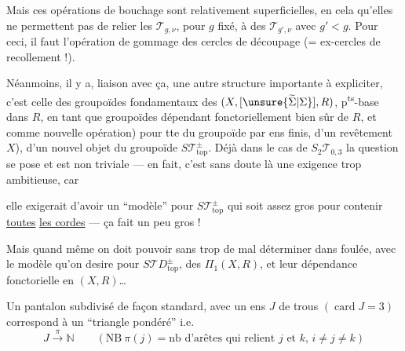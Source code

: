 Mais ces opérations de bouchage sont relativement superficielles, en cela qu'elles ne permettent pas de relier les $\mathcal T_{g,\nu}$, pour $g$ fixé, à des $\mathcal T_{g',\nu}$ avec $g'<g$. Pour ceci, il faut l'opération  de gommage des cercles de découpage (= ex-cercles de recollement !).

Néanmoins, il y a,   liaison avec ça, une autre structure importante à expliciter, c'est celle des  groupoïdes fondamentaux  des $(X,[\unsure{\widetilde{\Sigma}|\Sigma}],R)$, p\textsuperscript{ts}-base dans $R$,  en tant que groupoïdes dépendant fonctoriellement bien sûr de $R$, et  comme nouvelle opération) pour tte   du groupoïde par ens finis, \inserted{[\unsure{définissant un}} d'un revêtement   $X$), d'un nouvel objet du  groupoïde $S\mathcal T_{\mathrm{top}}^\pm$. Déjà dans le cas de $S_2\mathcal T_{0,3}$ la question se pose et est non triviale --- en fait, c'est sans doute là une exigence trop ambitieuse, car


elle exigerait d'avoir un ``modèle'' pour $S\mathcal T_{\mathrm{top}}^\pm$ qui soit assez gros pour contenir  \uline{toutes} \uline{les cordes} --- ça fait un peu gros !

Mais quand même on doit pouvoir sans trop de mal déterminer dans  foulée, avec le modèle qu'on desire pour $S\mathcal TD_{\mathrm{top}}^\pm$, des  $\Pi_1(X,R)$, et leur dépendance fonctorielle en $(X,R)$\ldots
{}


Un pantalon  subdivisé de façon standard, avec un ens $J$ de trous $(\operatorname{card}J=3)$ correspond à un ``triangle pondéré'' i.e.
\[
J\xrightarrow{\pi}\mathbb N
\qquad(\mathrm{NB}\ \pi(j)=\text{nb d'arêtes qui relient $j$ et $k$, $i\ne j\ne k$})
\]

